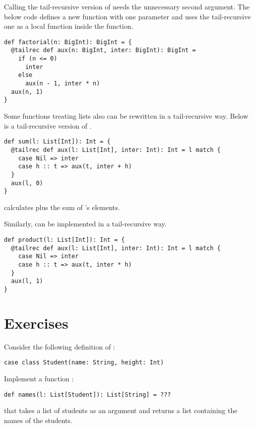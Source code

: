 Calling the tail-recursive version of  needs the unnecessary
second argument. The below code defines a new  function with one
parameter and uses the tail-recursive one as a local function inside the
function.

\begin{verbatim}
def factorial(n: BigInt): BigInt = {
  @tailrec def aux(n: BigInt, inter: BigInt): BigInt =
    if (n <= 0)
      inter
    else
      aux(n - 1, inter * n)
  aux(n, 1)
}
\end{verbatim}

Some functions treating lists also can be rewritten in a tail-recursive way.
Below is a tail-recursive version of .

\begin{verbatim}
def sum(l: List[Int]): Int = {
  @tailrec def aux(l: List[Int], inter: Int): Int = l match {
    case Nil => inter
    case h :: t => aux(t, inter + h)
  }
  aux(l, 0)
}
\end{verbatim}

 calculates  plus the sum of 's elements.

Similarly,  can be implemented in a tail-recursive way.

\begin{verbatim}
def product(l: List[Int]): Int = {
  @tailrec def aux(l: List[Int], inter: Int): Int = l match {
    case Nil => inter
    case h :: t => aux(t, inter * h)
  }
  aux(l, 1)
}
\end{verbatim}

\section{Exercises}

\begin{exercise}

Consider the following definition of :
\begin{verbatim}
case class Student(name: String, height: Int)
\end{verbatim}
Implement a function :
\begin{verbatim}
def names(l: List[Student]): List[String] = ???
\end{verbatim}
that takes a list of students as an argument
and returns a list containing the names of the students.

\end{exercise}

